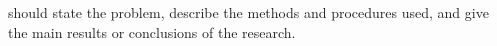 
 should state the problem, describe the methods and procedures used, and give the main results or conclusions of the research.